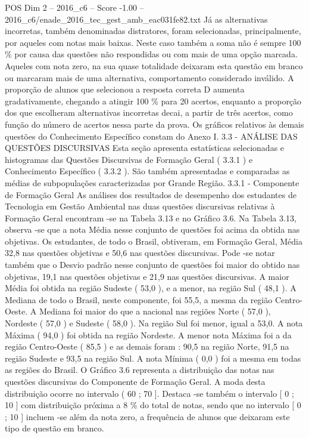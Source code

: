 \begin{textsample}{POS Dim 2 – 2016\_c6 – Score -1.00 – 2016\_c6/enade\_2016\_tec\_gest\_amb\_eac031fe82.txt}
Já as alternativas incorretas, também denominadas distratores, foram selecionadas, principalmente, por aqueles com notas mais baixas.
Neste caso também a soma não é sempre 100 \% por causa das questões não respondidas ou com mais de uma opção marcada.
Aqueles com nota zero, na sua quase totalidade deixaram esta questão em branco ou marcaram mais de uma alternativa, comportamento considerado inválido.
A proporção de alunos que selecionou a resposta correta D aumenta gradativamente, chegando a atingir 100 \% para 20 acertos, enquanto a proporção dos que escolheram alternativas incorretas decai, a partir de três acertos, como função do número de acertos nessa parte da prova.
Os gráficos relativos às demais questões do Conhecimento Específico constam do Anexo I. 3.3 - ANÁLISE DAS QUESTÕES DISCURSIVAS Esta seção apresenta estatísticas selecionadas e histogramas das Questões Discursivas de Formação Geral ( 3.3.1 ) e Conhecimento Específico ( 3.3.2 ).
São também apresentadas e comparadas as médias de subpopulações caracterizadas por Grande Região. 3.3.1 - Componente de Formação Geral As análises dos resultados de desempenho dos estudantes de Tecnologia em Gestão Ambiental nas duas questões discursivas relativas à Formação Geral encontram -se na Tabela 3.13 e no Gráfico 3.6.
Na Tabela 3.13, observa -se que a nota Média nesse conjunto de questões foi acima da obtida nas objetivas.
Os estudantes, de todo o Brasil, obtiveram, em Formação Geral, Média 32,8 nas questões objetivas e 50,6 nas questões discursivas.
Pode -se notar também que o Desvio padrão nesse conjunto de questões foi maior do obtido nas objetivas, 19,1 nas questões objetivas e 21,9 nas questões discursivas.
A maior Média foi obtida na região Sudeste ( 53,0 ), e a menor, na região Sul ( 48,1 ).
A Mediana de todo o Brasil, neste componente, foi 55,5, a mesma da região Centro-Oeste.
A Mediana foi maior do que a nacional nas regiões Norte ( 57,0 ), Nordeste ( 57,0 ) e Sudeste ( 58,0 ).
Na região Sul foi menor, igual a 53,0.
A nota Máxima ( 94,0 ) foi obtida na região Nordeste.
A menor nota Máxima foi a da região Centro-Oeste ( 85,5 ) e as demais foram : 90,5 na região Norte, 91,5 na região Sudeste e 93,5 na região Sul.
A nota Mínima ( 0,0 ) foi a mesma em todas as regiões do Brasil.
O Gráfico 3.6 representa a distribuição das notas nas questões discursivas do Componente de Formação Geral.
A moda desta distribuição ocorre no intervalo ( 60 ; 70 ].
Destaca -se também o intervalo [ 0 ; 10 ] com distribuição próxima a 8 \% do total de notas, sendo que no intervalo [ 0 ; 10 ] incluem -se além da nota zero, a frequência de alunos que deixaram este tipo de questão em branco.

\end{textsample}
